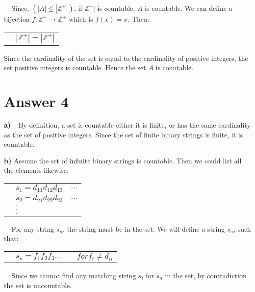 \documentclass[11pt]{article}
\begin{document}
\begin{flushleft}
    $\>\>\>\>\>$Since, $(|A|\leq|\mathbb{Z}^{+}|)$, if $\mathbb{Z}^{+}|$ is countable, $A$ is countable. 
    We can define a bijection $f:\mathbb{Z}^{+} \rightarrow \mathbb{Z}^{+}$ which is $f(x)=x$. Then:\\    
\end{flushleft}
\begin{tabular}{l l}
    & $|\mathbb{Z}^{+}| = |\mathbb{Z}^{+}|$ \\
\end{tabular}
\begin{flushleft}
    Since the cardinality of the set is equal to the cardinality of positive integers, the set positive integers is countable. Hence the set $A$ is countable.\\
\end{flushleft}
\section*{Answer 4}
\begin{flushleft}
    \textbf{a)}$\>\>\>\>\>$By definition, a set is countable either it is finite, or has the same cardinality as the set of positive integers. Since the set of finite binary strings is finite, it is countable.     
\end{flushleft}

\begin{flushleft}
    \textbf{b)} Assume the set of infinite binary strings is countable.
    Then we could list all the elements likewise:
\end{flushleft}
\begin{tabular}{l l l}
    & $s_1=d_{11} d_{12} d_{13}$ & $ ... $\\
    & $s_2=d_{21} d_{22} d_{23}$ & $ ... $\\
    & $.$&\\
    & $.$&\\
    & $.$&\\
\end{tabular}
\begin{flushleft}
    $\>\>\>\>\>$For any string $s_n$, the string must be in the set. We will define a string $s_n$, such that:
\end{flushleft}
\begin{tabular}{l l l l}
    & $s_n=f_{1} f_{2} f_{3}...$& & $for f_{i} \neq d_{ii}$\\
\end{tabular}
\begin{flushleft}
    $\>\>\>\>\>$Since we cannot find any matching string $s_i$ for $s_n$ in the set, by contradiction the set is uncountable. 
\end{flushleft}
\end{document}
